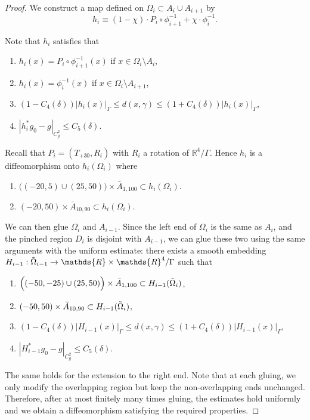 \documentclass[11pt,reqno]{amsart}
\numberwithin{equation}{section}
\newcommand{\RR}{\mathds{R}}
\theoremstyle{definition}
\theoremstyle{remark}
\begin{document}
\begin{proof}
We construct a map defined on $\Omega_i \subset A_i \cup A_{i+1}$ by
\begin{equation}
    h_i \equiv (1 - \chi) \cdot P_i \circ \phi^{-1}_{i+1}  + \chi \cdot \phi_{i}^{-1}.
\end{equation}

Note that $h_i$ satisfies that
\begin{enumerate}
    \item $h_i(x) = P_i \circ \phi_{i+1}^{-1}(x)$ if $x \in  \Omega_i \setminus A_i$,
    \item $h_i(x) =  \phi_{i}^{-1}(x)$ if $x \in \Omega_i \setminus A_{i+1}$,
    \item $(1-C_4(\delta))|h_i(x)|_{\Gamma} \leqslant d(x, \gamma)  \leqslant (1+C_4(\delta))|h_i(x)|_{\Gamma}$,
    \item $|h_i^* g_0 - g|_{C^2_g} \leqslant C_5(\delta)$.
\end{enumerate}


Recall that $P_i = (T_{+30},R_i)$ with $R_i$ a rotation of $\RR^4/\Gamma$. Hence $h_i$ is a diffeomorphism onto $h_i(\Omega_i)$ where
\begin{enumerate}
    \item $\Big( (-20,5) \cup (25,50) \Big) \times \bar{A}_{1,100} \subset h_i(\Omega_i)$.
    \item $(-20, 50) \times \bar{A}_{10,90} \subset h_i(\Omega_i)$.
\end{enumerate}

We can then glue $\Omega_i$ and $A_{i-1}$. Since the left end of $\Omega_i$ is the same as $A_i$, and the pinched region $D_i$ is disjoint with $A_{i-1}$, we can glue these two using the same arguments with the uniform estimate: there exists a smooth embedding $H_{i-1}: \Tilde{\Omega}_{i-1} \to \RR \times \RR^4/\Gamma$ such that
\begin{enumerate}
    \item $\Big((-50, -25) \cup (25, 50) \Big)\times \bar{A}_{1,100} \subset H_{i-1}(\Tilde{\Omega}_i)$,
    \item $(-50, 50) \times \bar{A}_{10,90} \subset H_{i-1}(\Tilde{\Omega}_i)$,
    \item $(1-C_4(\delta))|H_{i-1}(x)|_{\Gamma} \leqslant d(x, \gamma)  \leqslant (1+C_4(\delta))|H_{i-1}(x)|_{\Gamma}$,
    \item $|H_{i-1}^* g_0 - g|_{C^2_g} \leqslant C_5(\delta)$.
\end{enumerate}

The same holds for the extension to the right end. Note that at each gluing, we only modify the overlapping region but keep the non-overlapping ends unchanged. Therefore, after at most finitely many times gluing, the estimates hold uniformly and we obtain a diffeomorphism satisfying the required properties.  
\end{proof}
\end{document}
